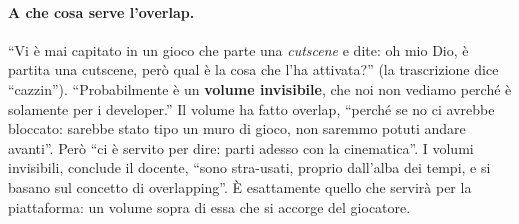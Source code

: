 \paragraph{A che cosa serve l'overlap.} ``Vi è mai capitato in un gioco che parte una
\emph{cutscene} e dite: oh mio Dio, è partita una cutscene, però qual è la cosa che l'ha
attivata?'' (la trascrizione dice ``cazzin''). ``Probabilmente è un \textbf{volume
invisibile}, che noi non vediamo perché è solamente per i developer.'' Il volume ha fatto
overlap, ``perché se no ci avrebbe bloccato: sarebbe stato tipo un muro di gioco, non
saremmo potuti andare avanti''. Però ``ci è servito per dire: parti adesso con la
cinematica''. I volumi invisibili, conclude il docente, ``sono stra-usati, proprio
dall'alba dei tempi, e si basano sul concetto di overlapping''. È esattamente quello che
servirà per la piattaforma: un volume sopra di essa che si accorge del giocatore.

